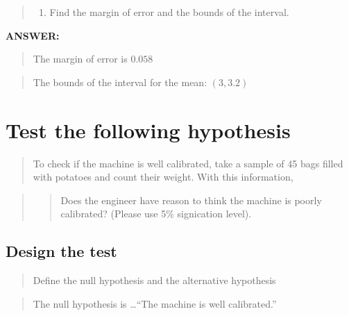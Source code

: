 \documentclass[
]{article}
\providecommand{\tightlist}{%
  \setlength{\itemsep}{0pt}\setlength{\parskip}{0pt}}
\begin{document}
\vspace{2cm}

\begin{quote}
\begin{enumerate}
\def\labelenumi{\arabic{enumi}.}
\setcounter{enumi}{2}
\tightlist
\item
  Find the margin of error and the bounds of the interval.
\end{enumerate}
\end{quote}

\textbf{ANSWER:} \vspace{2cm}

\begin{quote}
The margin of error is \(0.058\)
\end{quote}

\begin{quote}
The bounds of the interval for the mean: \((3 , 3.2)\)
\end{quote}

\newpage

\hypertarget{test-the-following-hypothesis}{%
\section{Test the following
hypothesis}\label{test-the-following-hypothesis}}

\begin{quote}
To check if the machine is well calibrated, take a sample of 45 bags
filled with potatoes and count their weight. With this information,
\end{quote}

\begin{quote}
\begin{quote}
Does the engineer have reason to think the machine is poorly calibrated?
(Please use 5\% signication level).
\end{quote}
\end{quote}

\hypertarget{design-the-test}{%
\subsection{Design the test}\label{design-the-test}}

\begin{quote}
Define the null hypothesis and the alternative hypothesis
\end{quote}

\begin{quote}
The null hypothesis is \ldots{}``The machine is well calibrated.''
\end{quote}
\end{document}
